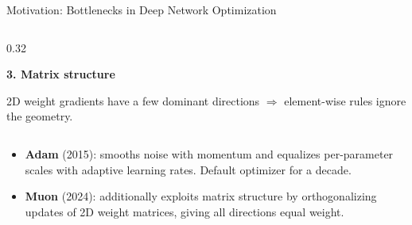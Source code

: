 \begin{frame}{Motivation: Bottlenecks in Deep Network Optimization}
\begin{columns}[T]
    \begin{column}{0.32\textwidth}
      \begin{center}\textbf{3. Matrix structure}\end{center}
      \vspace{0.2em}
      \begin{minipage}[t][3.0cm][t]{\linewidth}\centering
      \end{minipage}

      \vspace{0.3em}
      {\small 2D weight gradients have a few dominant directions $\Rightarrow$ element-wise rules ignore the geometry.}
    \end{column}
  \end{columns}

  \vspace{0.5em}
  \begin{itemize}
    \item \textbf{Adam} (2015): smooths noise with momentum and equalizes per-parameter scales with adaptive learning rates. Default optimizer for a decade.
    \item \textbf{Muon} (2024): additionally exploits matrix structure by orthogonalizing updates of 2D weight matrices, giving all directions equal weight.
  \end{itemize}

\end{frame}

